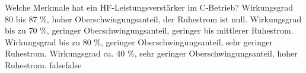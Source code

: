     {Welche Merkmale hat ein HF-Leistungsverstärker im C-Betrieb?}
    {Wirkungsgrad 80 bis 87 \%, hoher Oberschwingungsanteil, der Ruhestrom ist null.}
    {Wirkungsgrad bis zu 70 \%, geringer Oberschwingungsanteil, geringer bis mittlerer Ruhestrom.}
    {Wirkungsgrad bis zu 80 \%, geringer Oberschwingungsanteil, sehr geringer Ruhestrom.}
    {Wirkungsgrad ca. 40 \%, sehr geringer Oberschwingungsanteil, hoher Ruhestrom.}
    {false}{false}